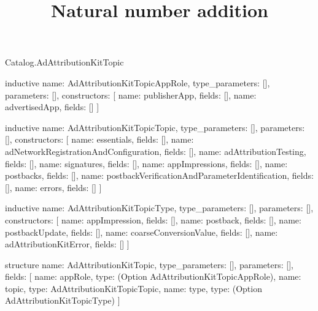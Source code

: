 \begin{lexlean}{Catalog.AdAttributionKitTopic}
\title{Natural number addition}
\begin{semanticmodule}
inductive{
  name: AdAttributionKitTopicAppRole,
  type_parameters: [],
  parameters: [],
  constructors: [
    {name: publisherApp, fields: []},
    {name: advertisedApp, fields: []}
  ]
}

inductive{
  name: AdAttributionKitTopicTopic,
  type_parameters: [],
  parameters: [],
  constructors: [
    {name: essentials, fields: []},
    {name: adNetworkRegistrationAndConfiguration, fields: []},
    {name: adAttributionTesting, fields: []},
    {name: signatures, fields: []},
    {name: appImpressions, fields: []},
    {name: postbacks, fields: []},
    {name: postbackVerificationAndParameterIdentification, fields: []},
    {name: errors, fields: []}
  ]
}

inductive{
  name: AdAttributionKitTopicType,
  type_parameters: [],
  parameters: [],
  constructors: [
    {name: appImpression, fields: []},
    {name: postback, fields: []},
    {name: postbackUpdate, fields: []},
    {name: coarseConversionValue, fields: []},
    {name: adAttributionKitError, fields: []}
  ]
}

structure{
  name: AdAttributionKitTopic,
  type_parameters: [],
  parameters: [],
  fields: [
    {name: appRole, type: (Option AdAttributionKitTopicAppRole)},
    {name: topic, type: AdAttributionKitTopicTopic},
    {name: type, type: (Option AdAttributionKitTopicType)}
  ]
}
\end{semanticmodule}
\end{lexlean}
